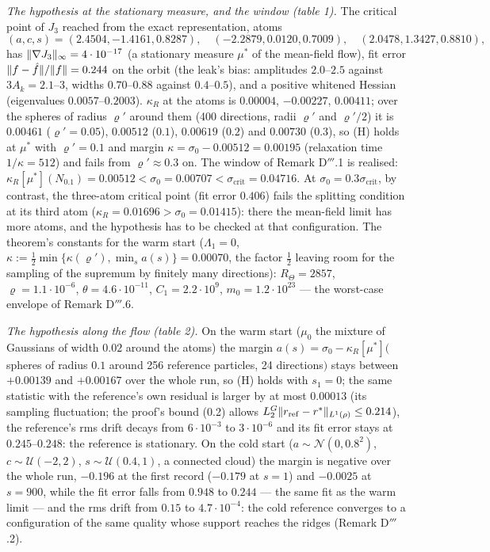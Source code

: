 \smallskip
\noindent\emph{The hypothesis at the stationary measure, and the window (table 1).} The critical point of $J_3$
reached from the exact representation, atoms
\[
  (a,c,s) = (2.4504,-1.4161,0.8287),\quad(-2.2879,0.0120,0.7009),\quad(2.0478,1.3427,0.8810),
\]
has $\lVert \nabla J_3\rVert_\infty = 4\cdot10^{-17}$ (a stationary measure $\mu^*$ of the
mean-field flow), fit error $\lVert f - \hat f\rVert/\lVert f\rVert = 0.244$ on the orbit (the leak's bias: amplitudes
$2.0$--$2.5$ against $3A_k = 2.1$--$3$, widths $0.70$--$0.88$ against $0.4$--$0.5$), and a positive whitened Hessian
(eigenvalues $0.0057$--$0.2003$). $\kappa_R$ at the atoms is $0.00004$, $-0.00227$, $0.00411$; over the spheres of
radius $\varrho'$ around them (400 directions, radii $\varrho'$ and $\varrho'/2$) it is $0.00461$
($\varrho' = 0.05$), $0.00512$ ($0.1$), $0.00619$ ($0.2$) and $0.00730$ ($0.3$), so (H) holds at $\mu^*$ with
$\varrho' = 0.1$ and margin $\kappa = \sigma_0 - 0.00512 = 0.00195$ (relaxation time $1/\kappa = 512$) and fails from
$\varrho'\approx0.3$ on. The window of Remark D$'''$.1 is realised:
$\kappa_R[\mu^*](N_{0.1}) = 0.00512 < \sigma_0 = 0.00707 < \sigma_{\mathrm{crit}} = 0.04716$. At
$\sigma_0 = 0.3\sigma_{\mathrm{crit}}$, by contrast, the three-atom critical point (fit error $0.406$) fails the
splitting condition at its third atom ($\kappa_R = 0.01696 > \sigma_0 = 0.01415$): there the mean-field limit has
more atoms, and the hypothesis has to be checked at that configuration. The theorem's constants for the warm start
($\Lambda_1 = 0$, $\kappa := \frac12\min\{\kappa(\varrho'),\min_sa(s)\} = 0.00070$, the factor $\frac12$ leaving room for the
sampling of the supremum by finitely many directions): $R_\Theta = 2857$,
$\varrho = 1.1\cdot10^{-6}$, $\theta = 4.6\cdot10^{-11}$, $C_1 = 2.2\cdot10^9$, $m_0 = 1.2\cdot10^{23}$ --- the
worst-case envelope of Remark D$'''$.6.

\smallskip
\noindent\emph{The hypothesis along the flow (table 2).} On the warm start ($\mu_0$ the mixture of Gaussians of
width $0.02$ around the atoms) the margin $a(s) = \sigma_0 - \kappa_R[\mu^*]($spheres of radius $0.1$ around 256 reference
particles, 24 directions$)$ stays between $+0.00139$ and $+0.00167$ over the whole run, so (H) holds
with $s_1 = 0$; the same statistic with the reference's own residual is larger by at most $0.00013$ (its sampling
fluctuation; the proof's bound (0.2) allows $L_2^G\lVert r_{\mathrm{ref}} - r^*\rVert_{L^1(\rho)}\le0.214$), the
reference's rms drift decays from $6\cdot10^{-3}$ to $3\cdot10^{-6}$ and its fit error stays at $0.245$--$0.248$: the reference is stationary. On the cold start ($a\sim\mathcal{N}(0,0.8^2)$, $c\sim\mathcal{U}(-2,2)$,
$s\sim\mathcal{U}(0.4,1)$, a connected cloud) the margin is negative over the whole run, $-0.196$ at the first record ($-0.179$ at $s = 1$) and $-0.0025$ at
$s = 900$, while the fit error falls from $0.948$ to $0.244$ --- the same fit as the warm limit --- and
the rms drift from $0.15$ to $4.7\cdot10^{-4}$: the cold reference converges to a configuration of the same quality
whose support reaches the ridges (Remark D$'''$.2).

